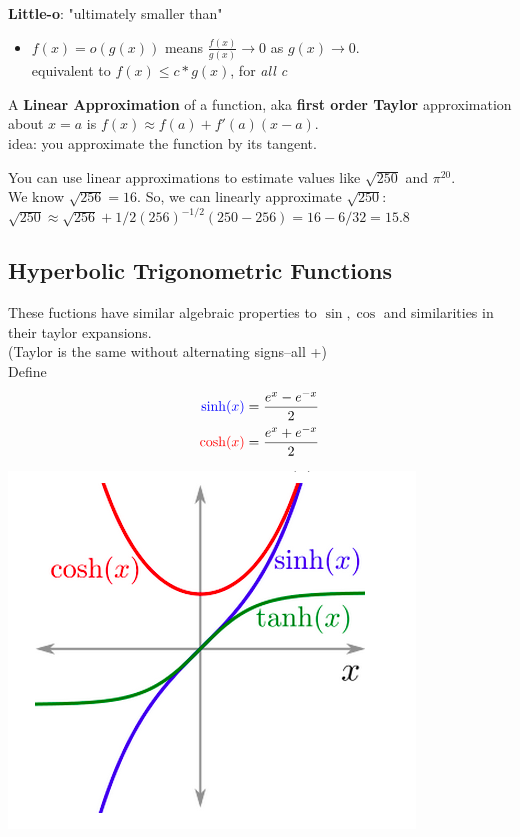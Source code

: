 \documentclass[a4paper, 12pt]{article}
\newcommand{\bt}[1]{\textbf{#1}} %
\newcommand{\eq}[1]{\begin{align*}#1\end{align*}} %
\renewcommand{\eq}[1]{\begin{align*}#1\end{align*}} %
\newcommand{\gray}[1]{\textcolor[gray]{0.5}{#1}} %
\newcommand{\blue}[1]{\textcolor{blue}{#1}} %
\begin{document}
\noindent \bt{Little-o}: "ultimately smaller than"
\begin{itemize}
    \item $f(x) = o(g(x))$ means $\displaystyle \frac{f(x)}{g(x)} \rightarrow 0$ as $g(x) \rightarrow 0$.\\
    \gray{equivalent to $f(x) \leq c * g(x)$, for \it{all} c}
\end{itemize}


A \bt{Linear Approximation} of a function, aka \bt{first order Taylor} approximation about $x=a$ is 
$f(x) \approx f(a) + f'(a) (x-a)$. \\
idea: you approximate the function by its tangent.

You can use linear approximations to estimate values like $\sqrt{250}$ and $\pi^{20}$.\\
\gray{We know $\sqrt{256} = 16$. So, we can linearly approximate $\sqrt{250}$:\\
$\sqrt{250} \approx \sqrt{256} + 1/2 (256)^{-1/2}(250-256) = 16 - 6/32 = 15.8$
}


\subsection{Hyperbolic Trigonometric Functions}

These fuctions have similar algebraic properties to $\sin, \cos$ and similarities in their taylor expansions. \\
\gray{(Taylor is the same without alternating signs--all +)}\\
Define 
\eq{
\blue{\sinh(x)} = \frac{e^x - e^{-x}}{2} \\
\textcolor{red}{\cosh(x)} = \frac{e^{x} + e^{-x}}{2} \\
}

\includegraphics[scale=0.5]{htrig.png}
\end{document}
